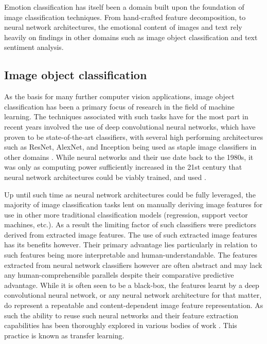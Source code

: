 \documentclass{article}
\begin{document}
Emotion classification has itself been a domain built upon the foundation of image classification techniques.
From hand-crafted feature decomposition, to neural network architectures, the emotional content of images and text rely heavily on findings in other domains such as image object classification and text sentiment analysis.

\subsection{Image object classification}

As the basis for many further computer vision applications, image object classification has been a primary focus of research in the field of machine learning.
The techniques associated with such tasks have for the most part in recent years involved the use of deep convolutional neural networks, which have proven to be state-of-the-art classifiers, with several high performing architectures such as ResNet, AlexNet, and Inception being used as staple image classifiers in other domains \citep{pan2009survey}.
While neural networks and their use date back to the 1980s, it was only as computing power sufficiently increased in the 21st century that neural network architectures could be viably trained, and used \citep{rawat2017deep}.

Up until such time as neural network architectures could be fully leveraged, the majority of image classification tasks lent on manually deriving image features for use in other more traditional classification models (regression, support vector machines, etc.).
As a result the limiting factor of such classifiers were predictors derived from extracted image features.
The use of such extracted image features has its benefits however.
Their primary advantage lies particularly in relation to such features being more interpretable and human-understandable.
The features extracted from neural network classifiers however are often abstract and may lack any human-comprehensible parallels despite their comparative predictive advantage.
While it is often seen to be a black-box, the features learnt by a deep convolutional neural network, or any neural network architecture for that matter, do represent a repeatable and content-dependent image feature representation.
As such the ability to reuse such neural networks and their feature extraction capabilities has been thoroughly explored in various bodies of work \citep{kim2018building,pan2009survey,you2015robust}.
This practice is known as transfer learning.
\end{document}
